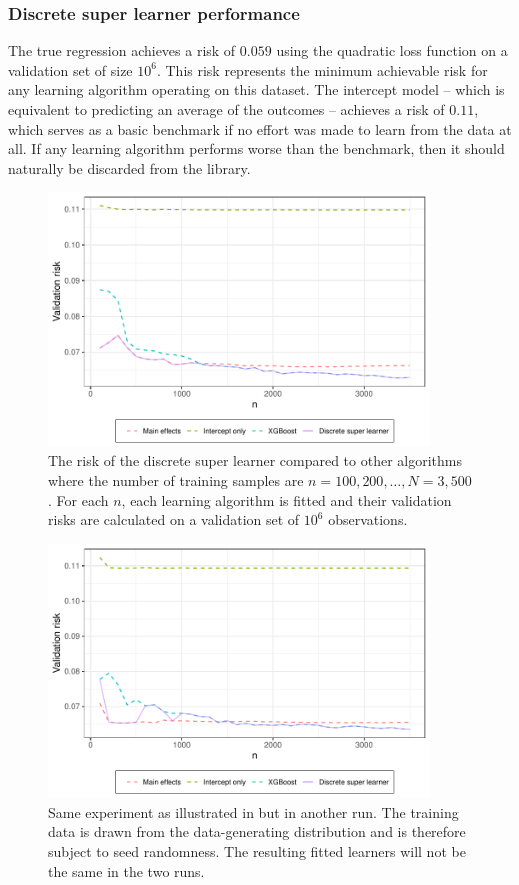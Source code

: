 \documentclass[./main.tex]{subfiles}
\begin{document}
\subsubsection{Discrete super learner performance}
The true regression achieves a risk of $ 0.059 $ using the quadratic loss function on a validation set of size $ 10^{6} $. This risk represents the minimum achievable risk for any learning algorithm operating on this dataset. The intercept model -- which is equivalent to predicting an average of the outcomes -- achieves a risk of $ 0.11 $, which serves as a basic benchmark if no effort was made to learn from the data at all. If any learning algorithm performs worse than the benchmark, then it should naturally be discarded from the library.  
\begin{figure}[H]
    \centering
    \includegraphics[width=0.9\textwidth]{figures/losses_s22.pdf}
    \caption{The risk of the discrete super learner compared to other algorithms where the number of training samples are $n = 100, 200, \dots , N = 3,500 $. For each $ n $, each learning algorithm is fitted and their validation risks are calculated on a validation set of $ 10^{6} $ observations.} 
    \label{fig:loss_min_of_both}
\end{figure}
\begin{figure}[H]
    \centering
    \includegraphics[width=0.9\textwidth]{figures/losses_s23.pdf}
    \caption{Same experiment as illustrated in  but in another run. The training data is drawn from the data-generating distribution and is therefore subject to seed randomness. The resulting fitted learners will not be the same in the two runs.}
    \label{fig:loss_jumps}
\end{figure}
\end{document}
